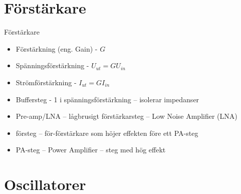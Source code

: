 \documentclass{beamer}
\begin{document}
\section{Förstärkare}

\begin{frame}{Förstärkare}
  \begin{itemize}
  \item Förstärkning (eng. Gain) - $G$
  \item Spänningsförstärkning - $U_{ut} = G U_{in}$
  \item Strömförstärkning - $I_{ut} = G I_{in}$
  \item Buffersteg - 1 i spänningsförstärkning -- isolerar impedanser
  \item Pre-amp/LNA -- lågbrusigt förstärkarsteg -- Low Noise Amplifier (LNA)
  \item försteg -- för-förstärkare som höjer effekten före ett PA-steg
  \item PA-steg -- Power Amplifier -- steg med hög effekt
  \end{itemize}
\end{frame}

\section{Oscillatorer}
\end{document}
